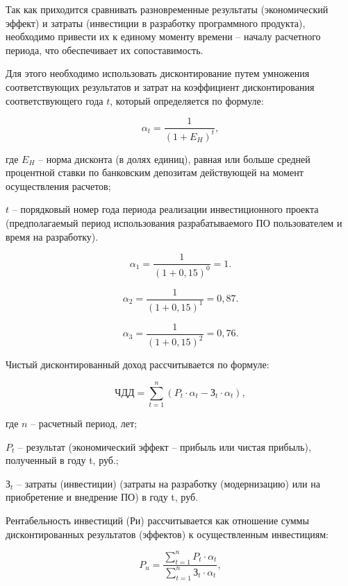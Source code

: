 Так как приходится сравнивать разновременные результаты (экономический эффект) и затраты (инвестиции в  разработку программного продукта), необходимо привести их к единому моменту времени -- началу расчетного периода, что обеспечивает их сопоставимость.

Для этого необходимо использовать дисконтирование путем умножения соответствующих результатов и затрат на коэффициент дисконтирования соответствующего года $t$, который определяется по формуле:

\begin{equation}
    \alpha _{t} = \frac{1}{(1 + E_{H})^{t}},
\end{equation}

где $E_{H}$ -- норма дисконта (в долях единиц), равная или больше средней процентной ставки по банковским депозитам действующей на момент осуществления расчетов;

    $t$ -- порядковый номер года периода реализации инвестиционного проекта (предполагаемый период использования разрабатываемого ПО пользователем и время на разработку).

$$
    \alpha _{1} = \frac{1}{(1 + 0,15)^{0}} =  1.
$$

$$
    \alpha _{2} = \frac{1}{(1 + 0,15)^{1}} =  0,87.
$$

$$
    \alpha _{3} = \frac{1}{(1 + 0,15)^{2}} =  0,76.
$$

Чистый дисконтированный доход  рассчитывается по формуле:

\begin{equation}
    \text{ЧДД} = \sum_{t=1}^{n}{(P_{t}\cdot \alpha _{t} - \text{З}_{t}\cdot \alpha _{t})},
\end{equation}

где $n$ -- расчетный период, лет;

    $P_{t}$ -- результат (экономический эффект – прибыль или чистая прибыль), полученный в  году t,  руб.;

    $\text{З}_{t}$ -- затраты (инвестиции) (затраты на разработку (модернизацию) или на приобретение и внедрение ПО) в году t, руб.



Рентабельность инвестиций (Ри) рассчитывается как отношение суммы дисконтированных результатов (эффектов) к осуществленным инвестициям:

\begin{equation}
    P_{u}=\frac{\sum_{t=1}^{n}{P_{t} \cdot \alpha _{t}}}{\sum_{t=1}^{n}{\text{З}_{t}\cdot \alpha _{t}}},
\end{equation}

